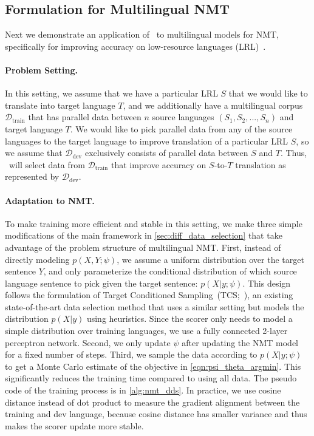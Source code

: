 \subsection{\label{sec:nmt_method}Formulation for Multilingual NMT}

Next we demonstrate an application of \dds~to multilingual models for NMT, specifically for improving accuracy on low-resource languages (LRL)~\citep{nmt_transfer,rapid_adapt_nmt}.

\paragraph{Problem Setting.} In this setting, we assume that we have a particular LRL $S$ that we would like to translate into target language $T$, and we additionally have a multilingual corpus $\mathcal{D}_{\text{train}}$ that has parallel data between $n$ source languages $(S_1, S_2, ..., S_n)$ and target language $T$. We would like to pick parallel data from any of the source languages to the target language to improve translation of a particular LRL $S$, so we assume that $\mathcal{D}_{\text{dev}}$ exclusively consists of parallel data between $S$ and $T$.
Thus, \dds~will select data from $\mathcal{D}_{\text{train}}$ that improve accuracy on $S$-to-$T$ translation as represented by $\mathcal{D}_{\text{dev}}$.

\paragraph{Adaptation to NMT.} To make training more efficient and stable in this setting, we make three simple modifications of the main framework in \autoref{sec:diff_data_selection} that take advantage of the problem structure of multilingual NMT.
First, instead of directly modeling $p(X,Y;\psi)$, we assume a uniform distribution over the target sentence $Y$, %
and only parameterize the conditional distribution of which source language sentence to pick given the target sentence: $p(X|y;\psi)$. This design follows the formulation of Target Conditioned Sampling~(TCS;~\citet{TCS}), an existing state-of-the-art data selection method that uses a similar setting but models the distribution $p(X|y)$ using heuristics.  Since the scorer only needs to model a simple distribution over training languages, we use a fully connected 2-layer perceptron network.
Second, we only update $\psi$ after updating the NMT model for a fixed number of steps.
Third, we sample the data according to $p(X|y;\psi)$ to get a Monte Carlo estimate of the objective in \autoref{eqn:psi_theta_argmin}.
This significantly reduces the training time compared to using all data. The pseudo code of the training process is in \autoref{alg:nmt_dds}. In practice, we use cosine distance instead of dot product to measure the gradient alignment between the training and dev language, because cosine distance has smaller variance and thus makes the scorer update more stable.

